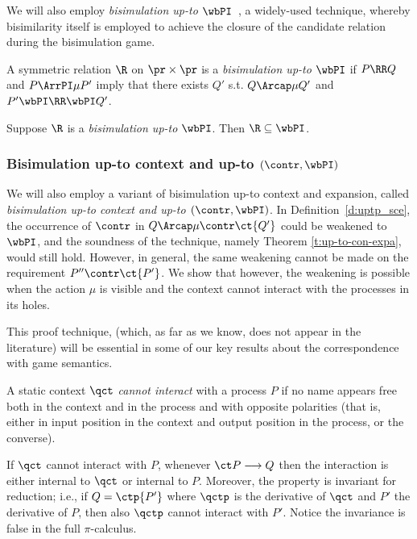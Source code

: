 We will also employ {\em bisimulation up-to $\wbPI$}~\cite{Mil89}, 
a widely-used technique,
whereby bisimilarity itself is employed to achieve 
the closure of the candidate relation during the bisimulation game.


\begin{definition}
  A symmetric relation $\R$ on $\pr  \times \pr$
  is a {\em bisimulation up-to $\wbPI$ } if $P  \RR  Q$ and $P
  \ArrPI\mu P'$ imply that  there exists $Q'$ s.t.
  $Q \Arcap\mu Q'$ and 
  $P' \wbPI  \RR \wbPI Q'$. 
\end{definition}
 

\begin{theorem}
\label{t:up-to}
  Suppose $\R$ is a {\em bisimulation up-to $\wbPI$}.
  Then $\R \subseteq \wbPI$.
\end{theorem}


\subsubsection{Bisimulation up-to context and up-to $(\contr,
\wbPI)$}

We will also employ
a variant of bisimulation up-to context and expansion, called 
{\em bisimulation up-to context and up-to $(\contr,\wbPI)$}.
In Definition~\ref{d:uptp_sce}, the occurrence of $\contr$  in 
$Q \Arcap\mu  \contr  \ct{Q'}$  could be weakened to $\wbPI$, and the
soundness of the technique, namely Theorem \ref{t:up-to-con-expa},
would still hold. However, in general, the same weakening
cannot be made on the requirement $P'' \contr \ct {P'}$.
We show that however, the weakening is possible when 
the action $\mu$ is visible and the context cannot interact with the
processes in its holes.

This proof technique, 
(which, as far as we know, does not appear in the literature) 
will be essential in some of our key results 
about the correspondence with game semantics.

\begin{definition}
  \label{d:interact}
  A static context $\qct$  \emph{cannot interact} with a process $P$
  if no name appears free both in the context and in
  the process and with opposite polarities (that is, either in input
  position in the context and output position in the process, or the
  converse).  
\end{definition} 

If  $\qct$ {cannot interact} with $P$,
whenever $\ct P \longrightarrow Q$ then  the
interaction is either internal to $\qct$ or internal to $P$. Moreover,
the property is invariant for reduction; i.e., 
if $Q = \ctp{P'}$ where $\qctp$ is the derivative of $\qct$ and $P'$
the derivative of $P$, then also 
$\qctp$  cannot interact with  $P'$.
Notice the invariance is false in the full $\pi$-calculus. 



